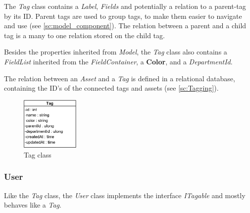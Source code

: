 The \textit{Tag} class contains a \textit{Label}, \textit{Fields} and potentially a relation to a parent-tag by its ID. Parent tags are used to group tags, to make them easier to navigate and use (see \autoref{sc:model_component}). The relation between a parent and a child tag is a many to one relation stored on the child tag.
\par
Besides the properties inherited from \textit{Model}, the \textit{Tag} class also contains a \textit{FieldList} inherited from the \textit{FieldContainer}, a \textbf{Color}, and a \textit{DepartmentId}.
\par
The relation between an \textit{Asset} and a \textit{Tag} is defined in a relational database, containing the ID's of the connected tags and assets (see \autoref{sc:Tagging}).

\begin{figure}[H]
    \centering
    \includegraphics[width=0.25\textwidth]{figures/Implementation/Models/TagAttributes.png}
    \caption{Tag class}
    \label{fig:TagClass}
\end{figure}


\subsubsection{User} \label{sssc:Users}
Like the \textit{Tag} class, the \textit{User} class implements the interface \textit{ITagable} and mostly behaves like a \textit{Tag}.